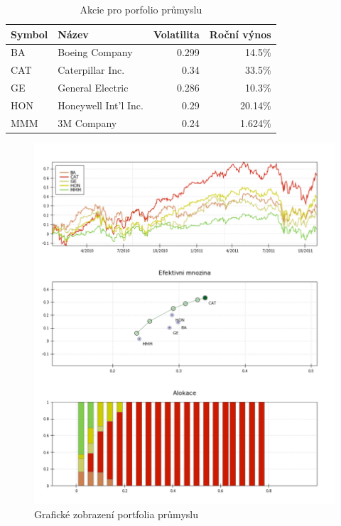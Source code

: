 \documentclass[12pt,a4paper]{report}
\begin{document}
    \begin{table}[htb]
      \centering
      \begin{tabular}{|l|l|r|r|}
        \hline
        Symbol&Název&Volatilita&Roční výnos\\\hline\hline
        BA&Boeing Company &0.299&14.5\%\\\hline
        CAT&Caterpillar Inc. &0.34&33.5\%\\\hline
        GE&General Electric &0.286&10.3\%\\\hline
        HON&Honeywell Int'l Inc. &0.29&20.14\%\\\hline
        MMM&3M Company &0.24&1.624\%\\\hline
      \end{tabular}
      \caption{Akcie pro porfolio průmyslu}
    \end{table}

    \begin{figure}[htb]
      \centering
        \includegraphics[height=0.90\textheight]{ind1.png}
       \caption{Grafické zobrazení portfolia průmyslu}
    \end{figure}
\end{document}
